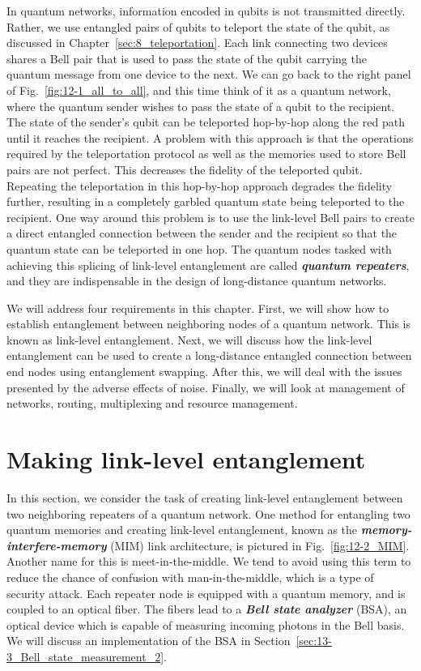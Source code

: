 In quantum networks, information encoded in qubits is not transmitted directly.
Rather, we use entangled pairs of qubits to teleport the state of the qubit, as discussed in Chapter~\ref{sec:8_teleportation}.
Each link connecting two devices shares a Bell pair that is used to pass the state of the qubit carrying the quantum message from one device to the next.
We can go back to the right panel of Fig.~\ref{fig:12-1_all_to_all}, and this time think of it as a quantum network, where the quantum sender wishes to pass the state of a qubit to the recipient.
The state of the sender's qubit can be teleported hop-by-hop along the red path until it reaches the recipient.
A problem with this approach is that the operations required by the teleportation protocol as well as the memories used to store Bell pairs are not perfect.
This decreases the fidelity of the teleported qubit.
Repeating the teleportation in this hop-by-hop approach degrades the fidelity further, resulting in a completely garbled quantum state being teleported to the recipient.
One way around this problem is to use the link-level Bell pairs to create a direct entangled connection between the sender and the recipient so that the quantum state can be teleported in one hop.
The quantum nodes tasked with achieving this splicing of link-level entanglement are called \textit{\textbf{quantum repeaters}}, and they are indispensable in the design of long-distance quantum networks.

We will address four requirements in this chapter.
First, we will show how to establish entanglement between neighboring nodes of a quantum network. This is known as link-level entanglement.
Next, we will discuss how the link-level entanglement can be used to create a long-distance entangled connection between end nodes using entanglement swapping.
After this, we will deal with the issues presented by the adverse effects of noise.
Finally, we will look at management of networks, routing, multiplexing and resource management.


\section{Making link-level entanglement}
\label{sec:12-2_making_link_level_rantanglement}

In this section, we consider the task of creating link-level entanglement between two neighboring repeaters of a quantum network.
One method for entangling two quantum memories and creating link-level entanglement, known as the \textit{\textbf{memory-interfere-memory}} (MIM) link architecture, is pictured in Fig.~\ref{fig:12-2_MIM}.
Another name for this is meet-in-the-middle.  We tend to avoid using this term to reduce the chance of confusion with man-in-the-middle, which is a type of security attack.
Each repeater node is equipped with a quantum memory, and is coupled to an optical fiber.
The fibers lead to a \textit{\textbf{Bell state analyzer}} (BSA), an optical device which is capable of measuring incoming photons in the Bell basis.
We will discuss an implementation of the BSA in Section~\ref{sec:13-3_Bell_state_measurement_2}.

